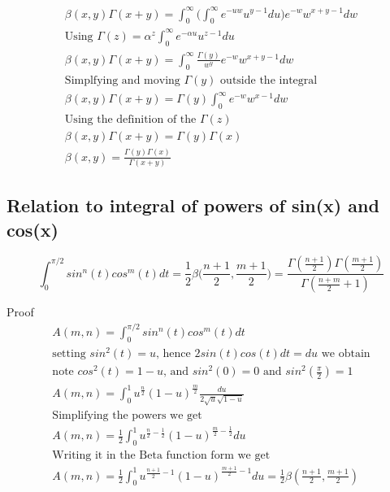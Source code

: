 \documentclass[a4paper]{article}
\begin{document}
\begin{theorem}
\begin{gather*}
\beta(x, y) \Gamma(x+y) =
\int_{0}^{\infty} \Big( \int_{0}^{\infty} e^{-uw} u^{y-1} du \Big) e^{-w} w^{x+y-1} dw
\\
\text{Using $\Gamma(z) = \alpha^z  \int_{0}^{\infty} e^{-\alpha u} u^{z-1} du$}
\\
\beta(x, y) \Gamma(x+y) =
\int_{0}^{\infty} \frac{\Gamma(y)}{w^y}  e^{-w} w^{x+y-1} dw
\\
\text{Simplfying and moving $\Gamma(y)$ outside the integral}
\\
\beta(x, y) \Gamma(x+y) = \Gamma(y)
\int_{0}^{\infty} e^{-w} w^{x-1} dw
\\
\text{Using the definition of the $\Gamma(z)$}
\\
\beta(x, y) \Gamma(x+y) = \Gamma(y) \Gamma(x)
\\
\beta(x, y)  =\frac{\Gamma(y) \Gamma(x)}{\Gamma(x+y)}  
\end{gather*}
\end{theorem}

\subsection{Relation to integral of powers of sin(x) and cos(x)}

\begin{theorem}
\begin{equation}
\boxed{
\int_{0}^{\pi/2} sin^{n}(t) cos^{m}(t) dt = \frac{1}{2} \beta \Big( \frac{n+1}{2}, \frac{m+1}{2} \Big)
=
\frac{\Gamma(\frac{n+1}{2}) \Gamma(\frac{m+1}{2})}{\Gamma(\frac{n+m}{2} + 1)} 
}
\end{equation}

Proof
\\
\begin{gather*}
A(m, n) = \int_{0}^{\pi/2} sin^{n}(t) cos^{m}(t) dt
\\
\text{setting $sin^{2}(t) = u$, hence $2 sin(t) cos(t) dt = du$ we obtain}
\\
\text{note $cos^{2}(t) = 1-u$, and $sin^{2}(0) = 0$ and $sin^{2}(\frac{\pi}{2}) = 1$}
\\
A(m, n) = \int_{0}^{1} u^{\frac{n}{2}} (1-u)^{\frac{m}{2}} \frac{du}{2 \sqrt{u} \sqrt{1-u}}
\\
\text{Simplifying the powers we get}
\\
A(m, n) = \frac{1}{2} \int_{0}^{1} u^{\frac{n}{2} -\frac{1}{2}} (1-u)^{\frac{m}{2}-\frac{1}{2}} du
\\
\text{Writing it in the Beta function form we get}
\\
A(m, n) = \frac{1}{2} \int_{0}^{1} u^{\frac{n+1}{2}- 1} (1-u)^{\frac{m+1}{2} -1} du = \frac{1}{2} \beta(\frac{n+1}{2}, \frac{m+1}{2})
\end{gather*}
\end{theorem}
\end{document}
